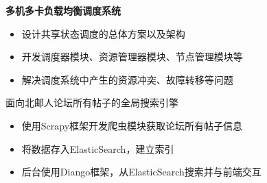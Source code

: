 \documentclass{resume}
\begin{document}
\textbf{多机多卡负载均衡调度系统}
\begin{itemize}
  \item 设计共享状态调度的总体方案以及架构
  \item 开发调度器模块、资源管理器模块、节点管理模块等
  \item 解决调度系统中产生的资源冲突、故障转移等问题
\end{itemize}

\begin{onehalfspacing}
面向北邮人论坛所有帖子的全局搜索引擎
\begin{itemize}
  \item 使用Scrapy框架开发爬虫模块获取论坛所有帖子信息
  \item 将数据存入ElasticSearch，建立索引
  \item 后台使用Diango框架，从ElasticSearch搜索并与前端交互
\end{itemize}
\end{onehalfspacing}



\end{document}
